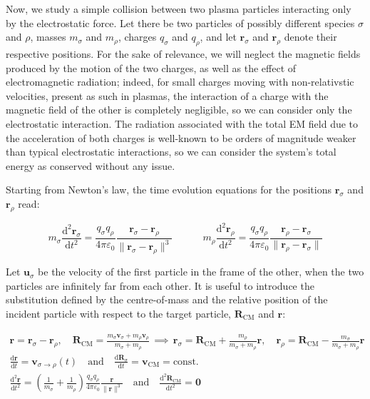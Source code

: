 Now, we study a simple collision between two plasma particles interacting only by the electrostatic force. Let there be two particles of possibly different species $\sigma$ and $\rho$, masses $m_\sigma$ and $m_\rho$, charges $q_\sigma$ and $q_\rho$, and let $\mathbf{r}_\sigma$ and $\mathbf{r}_\rho$ denote their respective positions. For the sake of relevance, we will neglect the magnetic fields produced by the motion of the two charges, as well as the effect of electromagnetic radiation; indeed, for small charges moving with non-relativstic velocities, present as such in plasmas, the interaction of a charge with the magnetic field of the other is completely negligible, so we can consider only the electrostatic interaction. The radiation associated with the total EM field due to the acceleration of both charges is well-known to be orders of magnitude weaker than typical electrostatic interactions, so we can consider the system's total energy as conserved without any issue.

\vspace*{2.5pt}

\quad Starting from Newton's law, the time evolution equations for the positions $\mathbf{r}_\sigma$ and $\mathbf{r}_\rho$ read:

\begin{equation*}
    m_\sigma\frac{\mathrm{d}^2\mathbf{r}_\sigma}{\mathrm{d}t^2}=\frac{q_\sigma q_\rho}{4\pi\varepsilon_0}\frac{\mathbf{r}_\sigma-\mathbf{r}_\rho}{\|\mathbf{r}_\sigma-\mathbf{r}_\rho\|^3}\quad\quad\quad m_\rho\frac{\mathrm{d}^2\mathbf{r}_\rho}{\mathrm{d}t^2}=\frac{q_\sigma q_\rho}{4\pi\varepsilon_0}\frac{\mathbf{r}_\rho-\mathbf{r}_\sigma}{\|\mathbf{r}_\rho-\mathbf{r}_\sigma\|}
\end{equation*}

Let $\mathbf{u}_\sigma$ be the velocity of the first particle in the frame of the other, when the two particles are infinitely far from each other. It is useful to introduce the substitution defined by the centre-of-mass and the relative position of the incident particle with respect to the target particle, $\mathbf{R}_{\mathrm{CM}}$ and $\mathbf{r}$: 

\begin{gather*}
    \mathbf{r}=\mathbf{r}_\sigma-\mathbf{r}_\rho,\quad \mathbf{R}_{\mathrm{CM}}=\frac{m_\sigma \mathbf{v}_\sigma+m_\rho \mathbf{v}_\rho}{m_\sigma+m_\rho}\,\implies\,\mathbf{r}_\sigma=\mathbf{R}_{\mathrm{CM}}+\frac{m_\rho}{m_\sigma+ m_\rho}\mathbf{r},\quad \mathbf{r}_\rho=\mathbf{R}_{\mathrm{CM}}-\frac{m_\sigma}{m_\sigma+m_\rho}\mathbf{r}\\
    \frac{\mathrm{d}\mathbf{r}}{\mathrm{d}t}=\mathbf{v}_{\sigma\to\rho}(t)\quad\text{and}\quad \frac{\mathrm{d}\mathbf{R}_\sigma}{\mathrm{d}t}=\mathbf{v}_{\mathrm{CM}}=\text{const.}\\
    \frac{\mathrm{d}^2\mathbf{r}}{\mathrm{d}t^2}=\left(\frac{1}{m_\sigma}+\frac{1}{m_\rho}\right)\frac{q_\sigma q_\rho}{4\pi\varepsilon_0}\frac{\mathbf{r}}{\|\mathbf{r}\|^3}\quad\text{and}\quad \frac{\mathrm{d}^2 \mathbf{R}_{\mathrm{CM}}}{\mathrm{d}t^2}=\mathbf{0}
\end{gather*}

